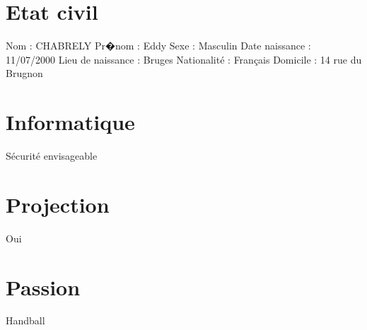 \documentclass{article}
\begin{document}
\section{Etat civil}
Nom : CHABRELY
\newline
Pr�nom : Eddy
\newline
Sexe : Masculin
\newline
Date naissance : 11/07/2000
\newline
Lieu de naissance : Bruges 
\newline
Nationalité : Français
\newline
Domicile : 14 rue du Brugnon


\section{Informatique}
Sécurité envisageable

\section{Projection}
Oui

\section{Passion}
Handball
\end{document}
